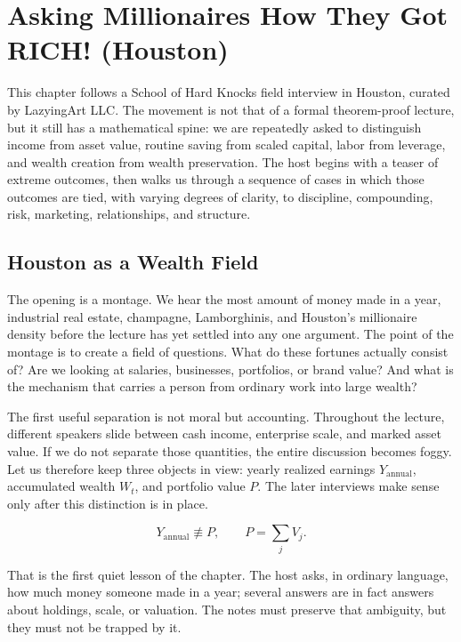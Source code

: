 \chapter{Asking Millionaires How They Got RICH! (Houston)}

This chapter follows a School of Hard Knocks field interview in Houston, curated by LazyingArt LLC. The movement is not that of a formal theorem-proof lecture, but it still has a mathematical spine: we are repeatedly asked to distinguish income from asset value, routine saving from scaled capital, labor from leverage, and wealth creation from wealth preservation. The host begins with a teaser of extreme outcomes, then walks us through a sequence of cases in which those outcomes are tied, with varying degrees of clarity, to discipline, compounding, risk, marketing, relationships, and structure.

\section{Houston as a Wealth Field}

The opening is a montage. We hear the most amount of money made in a year, industrial real estate, champagne, Lamborghinis, and Houston's millionaire density before the lecture has yet settled into any one argument. The point of the montage is to create a field of questions. What do these fortunes actually consist of? Are we looking at salaries, businesses, portfolios, or brand value? And what is the mechanism that carries a person from ordinary work into large wealth?

The first useful separation is not moral but accounting. Throughout the lecture, different speakers slide between cash income, enterprise scale, and marked asset value. If we do not separate those quantities, the entire discussion becomes foggy. Let us therefore keep three objects in view: yearly realized earnings \(Y_{\mathrm{annual}}\), accumulated wealth \(W_t\), and portfolio value \(P\). The later interviews make sense only after this distinction is in place.

\begin{equation}
Y_{\mathrm{annual}} \not\equiv P,
\qquad
P = \sum_j V_j.
\end{equation}

That is the first quiet lesson of the chapter. The host asks, in ordinary language, how much money someone made in a year; several answers are in fact answers about holdings, scale, or valuation. The notes must preserve that ambiguity, but they must not be trapped by it.


